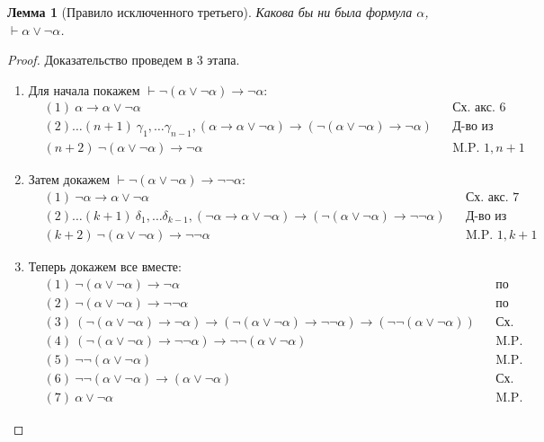 \documentclass[a4paper,11pt]{article}
\newtheorem{lmm}[thm]{Лемма}
\theoremstyle{definition}
\newcommand{\proves}{\vdash}
\begin{document}
\begin{lmm}[Правило исключенного третьего]
Какова бы ни была формула $\alpha$, $\proves \alpha \vee \neg\alpha$.
\end{lmm}
\begin{proof}
Доказательство проведем в 3 этапа.
\begin{enumerate}
\item Для начала покажем $\proves \neg(\alpha\vee\neg\alpha) \to \neg\alpha$:
  \begin{align*}
  &(1)\ \alpha \to \alpha\vee\neg\alpha &&\text{Сх. акс. 6}\\
  &(2)\dots(n+1)\ \gamma_1, \dots \gamma_{n-1}, (\alpha \to \alpha\vee\neg\alpha) \to (\neg(\alpha\vee\neg\alpha) \to \neg\alpha) &&\text{Д-во из леммы 5.4}\\
  &(n+2)\ \neg(\alpha\vee\neg\alpha) \to \neg\alpha &&\text{M.P. } 1, n+1
  \end{align*}
\item Затем докажем $\proves \neg(\alpha\vee\neg\alpha) \to \neg\neg\alpha$:
  \begin{align*}
  &(1)\ \neg\alpha \to \alpha\vee\neg\alpha &&\text{Сх. акс. 7}\\
  &(2)\dots(k+1)\ \delta_1, \dots \delta_{k-1}, (\neg\alpha \to \alpha\vee\neg\alpha) \to (\neg(\alpha\vee\neg\alpha) \to \neg\neg\alpha) &&\text{Д-во из леммы 5.4}\\
  &(k+2)\ \neg(\alpha\vee\neg\alpha) \to \neg\neg\alpha &&\text{M.P. } 1, k+1
  \end{align*}
\item Теперь докажем все вместе:
  \begin{align*}
  &(1)\ \neg(\alpha\vee\neg\alpha) \to \neg\alpha &&\text{по пункту 1}\\
  &(2)\ \neg(\alpha\vee\neg\alpha) \to \neg\neg\alpha &&\text{по пункту 2}\\
  &(3)\ (\neg(\alpha\vee\neg\alpha) \to \neg\alpha) \to (\neg(\alpha\vee\neg\alpha) \to \neg\neg\alpha) \to (\neg\neg(\alpha\vee\neg\alpha)) &&\text{Сх. акс. 9}\\
  &(4)\ (\neg(\alpha\vee\neg\alpha) \to \neg\neg\alpha) \to \neg\neg(\alpha\vee\neg\alpha) &&\text{M.P. 1,3}\\
  &(5)\ \neg\neg(\alpha\vee\neg\alpha) &&\text{M.P. 2,4}\\
  &(6)\ \neg\neg(\alpha\vee\neg\alpha) \to (\alpha\vee\neg\alpha) &&\text{Сх. акс. 10}\\
  &(7)\ \alpha\vee\neg\alpha &&\text{M.P. 5,6}
  \end{align*}
\end{enumerate}
\end{proof}
\end{document}
